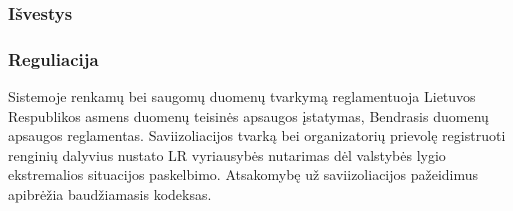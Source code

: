 \documentclass{VUMIFPSkursinis}
\begin{document}
\subsubsection{Išvestys}
\begin{table}[]
	\centering
\end{table}

\subsubsection{Reguliacija}
Sistemoje renkamų bei saugomų duomenų tvarkymą reglamentuoja Lietuvos Respublikos asmens duomenų teisinės apsaugos įstatymas,
Bendrasis duomenų apsaugos reglamentas. Saviizoliacijos tvarką bei organizatorių prievolę registruoti renginių dalyvius nustato
LR vyriausybės nutarimas dėl valstybės lygio ekstremalios situacijos paskelbimo. Atsakomybę už saviizoliacijos pažeidimus
apibrėžia baudžiamasis kodeksas.
\end{document}
